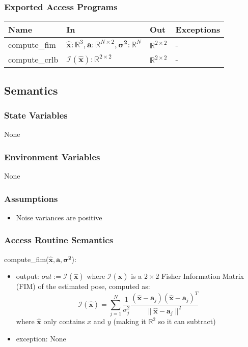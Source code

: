 \documentclass[12pt, titlepage]{article}
\begin{document}
\subsubsection{Exported Access Programs}

\begin{center}
\begin{tabular}{p{4cm} p{5cm} p{4cm} p{2cm}}
\hline
\textbf{Name} & \textbf{In} & \textbf{Out} & \textbf{Exceptions} \\
\hline
compute\_fim & $\hat{\mathbf{x}}: \mathbb{R}^3, \mathbf{a}: \mathbb{R}^{N \times 2}, \boldsymbol{\sigma^2}: \mathbb{R}^N$  & $\mathbb{R}^{2 \times 2}$ & - \\
compute\_crlb & $\boldsymbol{\mathcal{I}}(\hat{\mathbf{x}}): \mathbb{R}^{2 \times 2}$ & $\mathbb{R}^{2 \times 2}$ & - \\
\hline
\end{tabular}
\end{center}

\subsection{Semantics}

\subsubsection{State Variables}
None

\subsubsection{Environment Variables}
None

\subsubsection{Assumptions}
\begin{itemize}
  \item Noise variances are positive
\end{itemize}

\subsubsection{Access Routine Semantics}

\noindent compute\_fim($\hat{\mathbf{x}}, \mathbf{a}, \boldsymbol{\sigma^2}$):
\begin{itemize}
\item output: $out:=\boldsymbol{\mathcal{I}}(\hat{\mathbf{x}})$ where $\boldsymbol{\mathcal{I}}(\hat{\mathbf{x}})$ is a \( 2 \times 2 \) Fisher Information Matrix (FIM) of the estimated pose, computed as:
\[
\mathcal{I}(\hat{\mathbf{x}}) = \sum_{j=1}^{N} \frac{1}{\sigma_j^2} \frac{(\hat{\mathbf{x}} - \mathbf{a}_j)(\hat{\mathbf{x}} - \mathbf{a}_j)^T}{\|\hat{\mathbf{x}} - \mathbf{a}_j\|^2}
\]
where $\mathbf{\hat{x}}$ only contains $x$ and $y$ (making it $\mathbb{R}^2$ so it can subtract)
\item exception: None
\end{itemize}
\end{document}
